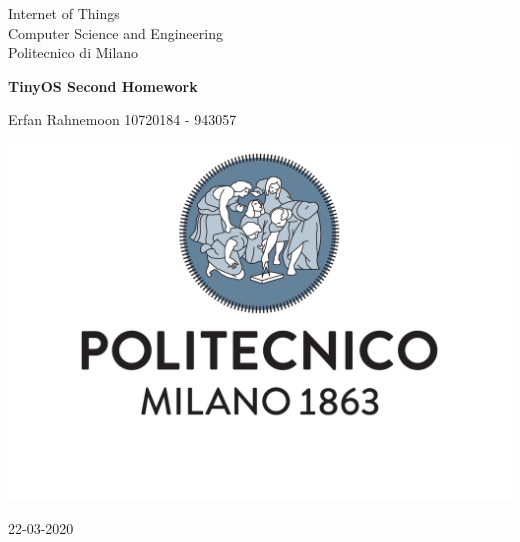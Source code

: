 \documentclass[10pt,english, openany]{book}
\begin{document}

\begin{titlepage}
	\clearpage\thispagestyle{empty}
	\centering
	\vspace{1cm}

	{\normalsize Internet of Things \\ 
		Computer Science and Engineering \\
		Politecnico di Milano \par}
		\vspace{3cm}
	{\Huge \textbf{TinyOS Second Homework}} \\
	\vspace{4cm}
	{\normalsize Erfan Rahnemoon 10720184 - 943057 \par}
	\vspace{5cm}
    
    \centering \includegraphics[scale=0.4]{logo1.pdf}
    
    \vspace{0.5cm}
		
	{\normalsize 22-03-2020 \par}
	

\end{titlepage}

\end{document}
